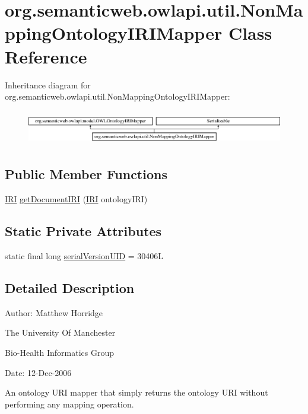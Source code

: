 \hypertarget{classorg_1_1semanticweb_1_1owlapi_1_1util_1_1_non_mapping_ontology_i_r_i_mapper}{\section{org.\-semanticweb.\-owlapi.\-util.\-Non\-Mapping\-Ontology\-I\-R\-I\-Mapper Class Reference}
\label{classorg_1_1semanticweb_1_1owlapi_1_1util_1_1_non_mapping_ontology_i_r_i_mapper}
}
Inheritance diagram for org.\-semanticweb.\-owlapi.\-util.\-Non\-Mapping\-Ontology\-I\-R\-I\-Mapper\-:\begin{figure}[H]
\begin{center}
\leavevmode
\includegraphics[height=1.555556cm]{classorg_1_1semanticweb_1_1owlapi_1_1util_1_1_non_mapping_ontology_i_r_i_mapper}
\end{center}
\end{figure}
\subsection*{Public Member Functions}
\begin{DoxyCompactItemize}
\item 
\hyperlink{classorg_1_1semanticweb_1_1owlapi_1_1model_1_1_i_r_i}{I\-R\-I} \hyperlink{classorg_1_1semanticweb_1_1owlapi_1_1util_1_1_non_mapping_ontology_i_r_i_mapper_a65ea1829f95300886f758283af0527b5}{get\-Document\-I\-R\-I} (\hyperlink{classorg_1_1semanticweb_1_1owlapi_1_1model_1_1_i_r_i}{I\-R\-I} ontology\-I\-R\-I)
\end{DoxyCompactItemize}
\subsection*{Static Private Attributes}
\begin{DoxyCompactItemize}
\item 
static final long \hyperlink{classorg_1_1semanticweb_1_1owlapi_1_1util_1_1_non_mapping_ontology_i_r_i_mapper_ac40a2c8a64c9084a7d61b94db47fcfb5}{serial\-Version\-U\-I\-D} = 30406\-L
\end{DoxyCompactItemize}


\subsection{Detailed Description}
Author\-: Matthew Horridge\par
 The University Of Manchester\par
 Bio-\/\-Health Informatics Group\par
 Date\-: 12-\/\-Dec-\/2006\par
\par
 An ontology U\-R\-I mapper that simply returns the ontology U\-R\-I without performing any mapping operation. 

